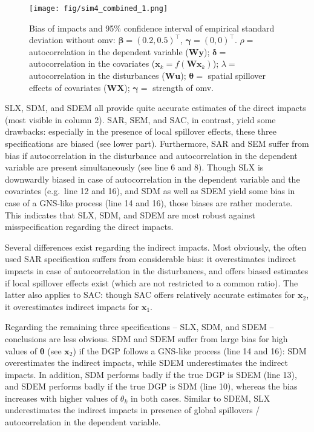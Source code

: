 \documentclass[
  letterpaper,
  DIV=11,
  numbers=noendperiod]{scrreprt}
\begin{document}
\begin{figure}

{\centering \texttt{[image: fig/sim4\_combined\_1.png]}

}

\caption{Bias of impacts and 95\% confidence interval of empirical
standard deviation without omv:
\({\boldsymbol{\mathbf{\beta}}}=(0.2, 0.5)^\intercal\),
\({\boldsymbol{\mathbf{\gamma}}}=(0, 0)^\intercal\). \(\rho=\)
autocorrelation in the dependent variable
(\(\boldsymbol{\mathbf{W}} \boldsymbol{\mathbf{y}}\));
\(\boldsymbol{\mathbf{\delta}}=\) autocorrelation in the covariates
(\(\boldsymbol{\mathbf{x}}_k = f(\boldsymbol{\mathbf{W}} \boldsymbol{\mathbf{x}}_k)\));
\(\lambda=\) autocorrelation in the disturbances
(\(\boldsymbol{\mathbf{W}} \boldsymbol{\mathbf{u}}\));
\(\boldsymbol{\mathbf{\theta}}=\) spatial spillover effects of
covariates (\(\boldsymbol{\mathbf{W}} \boldsymbol{\mathbf{X}}\));
\(\boldsymbol{\mathbf{\gamma}}=\) strength of omv.}

\end{figure}

SLX, SDM, and SDEM all provide quite accurate estimates of the direct
impacts (most visible in column 2). SAR, SEM, and SAC, in contrast,
yield some drawbacks: especially in the presence of local spillover
effects, these three specifications are biased (see lower part).
Furthermore, SAR and SEM suffer from bias if autocorrelation in the
disturbance and autocorrelation in the dependent variable are present
simultaneously (see line 6 and 8). Though SLX is downwardly biased in
case of autocorrelation in the dependent variable and the covariates
(e.g.~line 12 and 16), and SDM as well as SDEM yield some bias in case
of a GNS-like process (line 14 and 16), those biases are rather
moderate. This indicates that SLX, SDM, and SDEM are most robust against
misspecification regarding the direct impacts.

Several differences exist regarding the indirect impacts. Most
obviously, the often used SAR specification suffers from considerable
bias: it overestimates indirect impacts in case of autocorrelation in
the disturbances, and offers biased estimates if local spillover effects
exist (which are not restricted to a common ratio). The latter also
applies to SAC: though SAC offers relatively accurate estimates for
\({\boldsymbol{\mathbf{x}}}_2\), it overestimates indirect impacts for
\({\boldsymbol{\mathbf{x}}}_1\).

Regarding the remaining three specifications -- SLX, SDM, and SDEM --
conclusions are less obvious. SDM and SDEM suffer from large bias for
high values of \({\boldsymbol{\mathbf{\theta}}}\) (see
\(\boldsymbol{\mathbf{x}}_2\)) if the DGP follows a GNS-like process
(line 14 and 16): SDM overestimates the indirect impacts, while SDEM
underestimates the indirect impacts. In addition, SDM performs badly if
the true DGP is SDEM (line 13), and SDEM performs badly if the true DGP
is SDM (line 10), whereas the bias increases with higher values of
\(\theta_k\) in both cases. Similar to SDEM, SLX underestimates the
indirect impacts in presence of global spillovers / autocorrelation in
the dependent variable.
\end{document}

